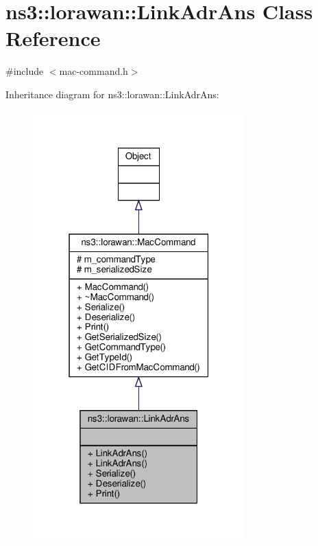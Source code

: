\hypertarget{classns3_1_1lorawan_1_1LinkAdrAns}{}\section{ns3\+:\+:lorawan\+:\+:Link\+Adr\+Ans Class Reference}
\label{classns3_1_1lorawan_1_1LinkAdrAns}


{\ttfamily \#include $<$mac-\/command.\+h$>$}



Inheritance diagram for ns3\+:\+:lorawan\+:\+:Link\+Adr\+Ans\+:
\nopagebreak
\begin{figure}[H]
\begin{center}
\leavevmode
\includegraphics[width=232pt]{classns3_1_1lorawan_1_1LinkAdrAns__inherit__graph}
\end{center}
\end{figure}


